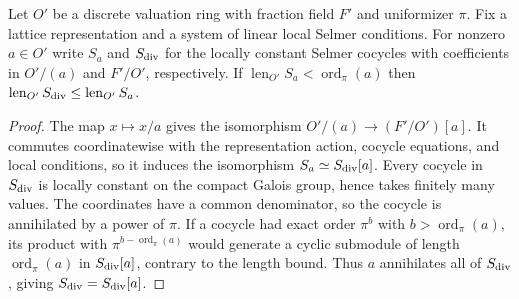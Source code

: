 \begin{lemma}
\label{lem:c-selmer-torsion-to-divisible}
\emitthmsource
Let $O'$ be a discrete valuation ring with fraction field $F'$ and uniformizer $\pi$.
Fix a lattice representation and a system of linear local Selmer conditions.
For nonzero $a\in O'$ write $S_a$ and $S_{\rm div}$ for the locally constant Selmer cocycles with coefficients in $O'/(a)$ and $F'/O'$, respectively.
If $\operatorname{len}_{O'}S_a<\operatorname{ord}_\pi(a)$ then $\operatorname{len}_{O'}S_{\rm div}\le\operatorname{len}_{O'}S_a$.
\end{lemma}
\begin{proof}
The map $x\mapsto x/a$ gives the isomorphism $O'/(a)\to (F'/O')[a]$.
It commutes coordinatewise with the representation action, cocycle equations, and local conditions, so it induces the isomorphism $S_a\simeq S_{\rm div}[a]$.
Every cocycle in $S_{\rm div}$ is locally constant on the compact Galois group, hence takes finitely many values. The coordinates have a common denominator, so the cocycle is annihilated by a power of $\pi$.
If a cocycle had exact order $\pi^b$ with $b>\operatorname{ord}_\pi(a)$, its product with $\pi^{b-\operatorname{ord}_\pi(a)}$ would generate a cyclic submodule of length $\operatorname{ord}_\pi(a)$ in $S_{\rm div}[a]$, contrary to the length bound.
Thus $a$ annihilates all of $S_{\rm div}$, giving $S_{\rm div}=S_{\rm div}[a]$.
\end{proof}

